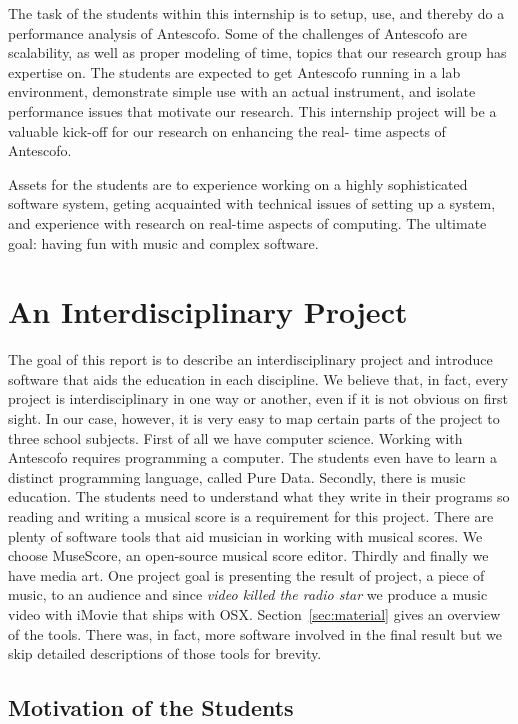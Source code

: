 \documentclass[onecolumn,nocopyrightspace,preprint]{sigplanconf}
\begin{document}
The task of the students within this internship is to setup, use, and thereby
do a performance analysis of Antescofo. Some of the challenges of Antescofo
are scalability, as well as proper modeling of time, topics that our research
group has expertise on. The students are expected to get Antescofo running in
a lab environment, demonstrate simple use with an actual instrument, and
isolate performance issues that motivate our research. This internship
project will be a valuable kick-off for our research on enhancing the real-
time aspects of Antescofo.

Assets for the students are to experience working on a highly sophisticated
software system, geting acquainted with technical issues of setting up a
system, and experience with research on real-time aspects of computing. The
ultimate goal: having fun with music and complex software.


\section{An Interdisciplinary Project}

The goal of this report is to describe an interdisciplinary project and
introduce software that aids the education in each discipline.  We believe
that, in fact, every project is interdisciplinary in one way or another, even
if it is not obvious on first sight. In our case, however, it is very easy to
map certain parts of the project to three school subjects. First of all we
have computer science. Working with Antescofo requires programming a computer.
The students even have to learn a distinct programming language, called Pure
Data. Secondly, there is music education. The students need to understand what
they write in their programs so reading and writing a musical score is a
requirement for this project. There are plenty of software tools that aid
musician in working with musical scores. We choose MuseScore, an open-source
musical score editor. Thirdly and finally we have media art. One project goal
is presenting the result of project, a piece of music, to an audience and
since \textit{video killed the radio star} we produce a music video with
iMovie that ships with OSX. Section~\ref{sec:material} gives an overview of
the tools. There was, in fact, more software involved in the final result but
we skip detailed descriptions of those tools for brevity.


\subsection{Motivation of the Students}
\end{document}
